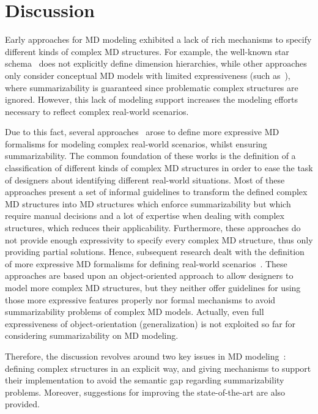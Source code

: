 \section{Discussion}
\label{a1:sec:discussion} Early approaches for MD modeling exhibited
a lack of rich mechanisms to specify different kinds of complex MD
structures. For example, the well-known star
schema~\cite{book/Kimball/DW} does not explicitly define dimension
hierarchies, while other approaches only consider conceptual MD
models with limited expressiveness (such
as~\cite{DBLP:journals/ijcis/GolfarelliMR98,DBLP:conf/dmdw/HusemannLV00}),
where summarizability is guaranteed since problematic complex
structures are ignored. However, this lack of modeling support
increases the modeling efforts necessary to reflect complex
real-world scenarios.

Due to this fact, several
approaches~\cite{DBLP:journals/is/PedersenJD01,DBLP:conf/caise/MalinowskiZ04,DBLP:journals/tods/HurtadoGM05,DBLP:conf/dawak/MansmannS06}
arose to define more expressive MD formalisms for modeling complex
real-world scenarios, whilst ensuring summarizability. The common
foundation of these works is the definition of a classification of
different kinds of complex MD structures in order to ease the task
of designers about identifying different real-world situations. Most
of these approaches present a set of informal guidelines to
transform the defined complex MD structures into MD structures which
enforce summarizability but which require manual decisions and a lot
of expertise when dealing with complex structures, which reduces
their applicability. Furthermore, these approaches do not provide
enough expressivity to specify every complex MD structure, thus only
providing partial solutions. Hence, subsequent research dealt with
the definition of more expressive MD formalisms for defining
real-world
scenarios~\cite{DBLP:journals/dke/Lujan-MoraTS06,DBLP:journals/is/AbelloSS06,DBLP:journals/dss/PratAC06}.
These approaches are based upon an object-oriented approach to allow
designers to model more complex MD structures, but they neither
offer guidelines for using those more expressive features properly
nor formal mechanisms to avoid summarizability problems of complex
MD models. Actually, even full expressiveness of object-orientation
(generalization) is not exploited so far for considering
summarizability on MD modeling.

Therefore, the discussion revolves around two key issues in MD
modeling~\cite{DBLP:conf/dolap/RizziALT06}: defining complex
structures in an explicit way, and giving mechanisms to support
their implementation to avoid the semantic gap regarding
summarizability problems. Moreover, suggestions for improving the
state-of-the-art are also provided.


